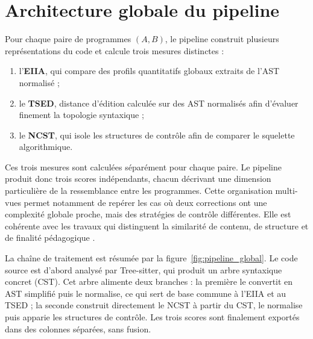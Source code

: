 {\section{Architecture globale du pipeline}

Pour chaque paire de programmes $(A,B)$, le pipeline construit plusieurs
représentations du code et calcule trois mesures distinctes :

\begin{enumerate}
    \item l'\textbf{EIIA}, qui compare des profils quantitatifs globaux
    extraits de l'AST normalisé ;
    \item le \textbf{TSED}, distance d'édition calculée sur des AST normalisés
    afin d'évaluer finement la topologie syntaxique ;
    \item le \textbf{NCST}, qui isole les structures de contrôle afin de
    comparer le squelette algorithmique.
\end{enumerate}

Ces trois mesures sont calculées séparément pour chaque paire. Le pipeline
produit donc trois scores indépendants, chacun décrivant une dimension
particulière de la ressemblance entre les programmes. Cette organisation
multi-vues permet notamment de repérer les cas où deux corrections ont une
complexité globale proche, mais des stratégies de contrôle différentes. Elle
est cohérente avec les travaux qui distinguent la similarité de contenu, de
structure et de finalité pédagogique \cite{pelanek_2020,reddy_graph-based_2025}.

La chaîne de traitement est résumée par la figure~\ref{fig:pipeline_global}.
Le code source est d'abord analysé par Tree-sitter, qui produit un arbre
syntaxique concret (CST). Cet arbre alimente deux branches : la première le
convertit en AST simplifié puis le normalise, ce qui sert de base commune à
l'EIIA et au TSED ; la seconde construit directement le NCST à partir du CST,
le normalise puis apparie les structures de contrôle. Les trois scores sont
finalement exportés dans des colonnes séparées, sans fusion.

\begin{figure}[H]
\centering
{}
\end{figure}}
